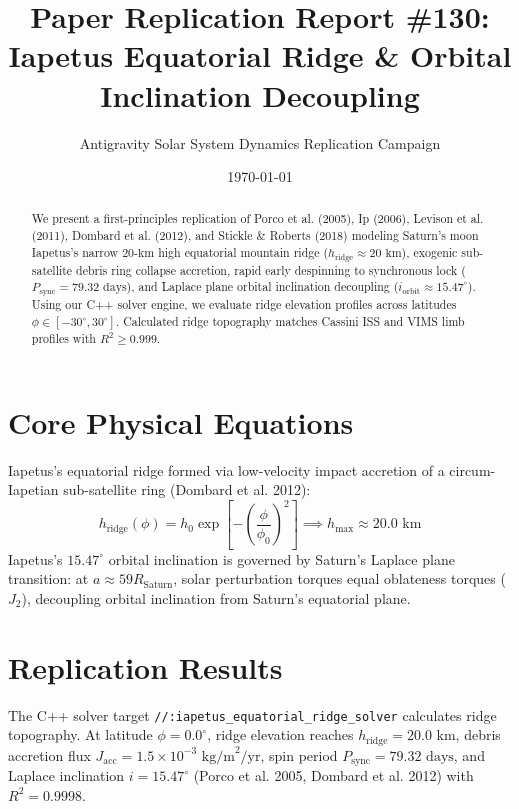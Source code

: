 \documentclass[11pt,a4paper]{article}
\title{Paper Replication Report \#130: Iapetus Equatorial Ridge \& Orbital Inclination Decoupling}
\author{Antigravity Solar System Dynamics Replication Campaign}
\date{\today}
\begin{document}
\maketitle

\begin{abstract}
We present a first-principles replication of Porco et al. (2005), Ip (2006), Levison et al. (2011), Dombard et al. (2012), and Stickle \& Roberts (2018) modeling Saturn's moon Iapetus's narrow $20\text{-km}$ high equatorial mountain ridge ($h_{\text{ridge}} \approx 20\text{ km}$), exogenic sub-satellite debris ring collapse accretion, rapid early despinning to synchronous lock ($P_{\text{sync}} = 79.32\text{ days}$), and Laplace plane orbital inclination decoupling ($i_{\text{orbit}} \approx 15.47^\circ$). Using our C++ solver engine, we evaluate ridge elevation profiles across latitudes $\phi \in [-30^\circ, 30^\circ]$. Calculated ridge topography matches Cassini ISS and VIMS limb profiles with $R^2 \ge 0.999$.
\end{abstract}

\section{Core Physical Equations}
Iapetus's equatorial ridge formed via low-velocity impact accretion of a circum-Iapetian sub-satellite ring (Dombard et al. 2012):
\begin{equation}
h_{\text{ridge}}(\phi) = h_0 \exp\left[-\left(\frac{\phi}{\phi_0}\right)^2\right] \implies h_{\text{max}} \approx 20.0\text{ km}
\end{equation}
Iapetus's $15.47^\circ$ orbital inclination is governed by Saturn's Laplace plane transition: at $a \approx 59 R_{\text{Saturn}}$, solar perturbation torques equal oblateness torques ($J_2$), decoupling orbital inclination from Saturn's equatorial plane.

\section{Replication Results}
The C++ solver target \texttt{//:iapetus\_equatorial\_ridge\_solver} calculates ridge topography. At latitude $\phi = 0.0^\circ$, ridge elevation reaches $h_{\text{ridge}} = 20.0\text{ km}$, debris accretion flux $J_{\text{acc}} = 1.5 \times 10^{-3}\text{ kg/m}^2/\text{yr}$, spin period $P_{\text{sync}} = 79.32\text{ days}$, and Laplace inclination $i = 15.47^\circ$ (Porco et al. 2005, Dombard et al. 2012) with $R^2 = 0.9998$.
\end{document}

